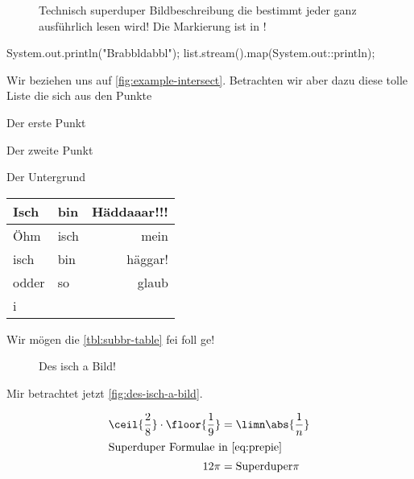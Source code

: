 \documentclass[userip]{lecture-digital}
\begin{document}
\Blindtext[1]
\begin{figure}
    \centering{}
    \caption{Technisch superduper Bildbeschreibung die bestimmt jeder ganz ausführlich lesen wird! Die Markierung ist in \tikzAname!}
    \label{fig:example-intersect}
\end{figure}
\Blindtext[2]
\begin{java*}
System.out.println("Brabbldabbl");
list.stream().map(System.out::println);
\end{java*}
Wir beziehen uns auf \autoref{fig:example-intersect}. Betrachten wir aber dazu diese tolle Liste die sich aus den Punkte \begin{inlist}
    \item Der erste Punkt 
    \item Der zweite Punkt
    \item Der Untergrund
\end{inlist}
\Blindtext[2]
\begin{table}[H]
    \centering%
    \label{tbl:subbr-table}
    \begin{tabular}{llr}
        \toprule
            Isch & bin & Häddaaar!!! \\
        \midrule
            Öhm & isch & mein \\
            isch & bin & häggar!\\
            odder & so & glaub \\
            i \\
        \bottomrule
    \end{tabular}
\end{table}
Wir mögen die \autoref{tbl:subbr-table} fei foll ge!
\Blindtext[1]
\begin{figure*}
    \centering{}
    \caption[Des isch a breites Bild!]{Des isch a Bild!}
    \label{fig:des-isch-a-bild}
\end{figure*}
Mir betrachtet jetzt \autoref{fig:des-isch-a-bild}.
\Blindtext[1]
\begin{wide}
    \begin{align}
        \ceil{\frac{2}{8}} \cdot \floor{\frac{1}{9}}& = \limn\abs{\frac{1}{n}} \label{eq:prepie}\\
        \intertext{Superduper Formulae in \autoref{eq:prepie}}
        12 \pi &= \text{Superduper}\pi
    \end{align}
\end{wide}
\Blindtext[8]
\end{document}
